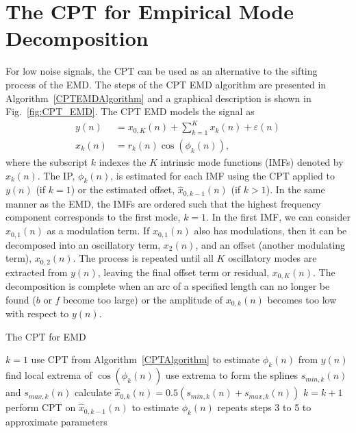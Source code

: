 \documentclass[11pt,draftcls,onecolumn]{IEEEtran}
\newcommand{\dean}[1]{\textsf{\emph{\textbf{\textcolor{green}{#1}}}}}
\begin{document}


\section{The CPT for Empirical Mode Decomposition}\label{sect:CPTEMDSection}
For low noise signals, the CPT can be used as an alternative to the sifting process of the EMD. The steps of the CPT EMD algorithm are presented in Algorithm~\ref{CPTEMDAlgorithm} and a graphical description is shown in Fig.~\ref{fig:CPT_EMD}. The CPT EMD models the signal as
\begin{align}
    y(n) &= x_{0,K}(n) + \sum_{k=1}^{K}x_k(n) + \varepsilon(n) \\
    x_k\left(n\right) &= r_k\left(n\right)\cos\left(\phi_k\left(n\right)\right),
\end{align}
where the subscript $k$ indexes the $K$ intrinsic mode functions (IMFs) denoted by $x_k(n)$. The IP, $\phi_k(n)$, is estimated for each IMF using the CPT applied to $y(n)$ (if $k=1$) or the estimated offset, $\hat{x}_{0,k-1}(n)$ (if $k>1$). In the same manner as the EMD, the IMFs are ordered such that the highest frequency component corresponds to the first mode, $k=1$. In the first IMF, we can consider $x_{0,1}(n)$ as a modulation term. If $x_{0,1}(n)$ also has modulations, then it can be decomposed into an oscillatory term, $x_2(n)$, and an offset (another modulating term), $x_{0,2}(n)$. The process is repeated until all $K$ oscillatory modes are extracted from $y(n)$, leaving the final offset term or residual, $x_{0,K}(n)$. The decomposition is complete when an arc of a specified length can no longer be found ($b$ or $f$ become too large) or the amplitude of $x_{0,k}(n)$ becomes too low with respect to $y(n)$.

\begin{algorithm}[ht]
\caption{The CPT for EMD}\label{CPTEMDAlgorithm}
\begin{algorithmic}[1]
\State $k=1$
\State use CPT from Algorithm~\ref{CPTAlgorithm} to estimate $\phi_k(n)$ from $y(n)$
\State find local extrema of $\cos\left(\hat\phi_k(n)\right)$
\State use extrema to form the splines $s_{min,k}(n)$ and $s_{max,k}(n)$
\State calculate $\hat{x}_{0,k}(n) = 0.5\left(s_{min,k}(n) + s_{max,k}(n)\right)$
    \State $k=k+1$
    \State perform CPT on $\hat{x}_{0,k-1}(n)$ to estimate $\phi_{k}(n)$
    \State repeats steps 3 to 5 to approximate parameters
\EndWhile
\end{algorithmic}
\end{algorithm}
\end{document}
